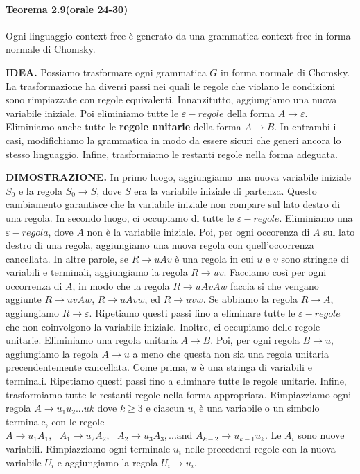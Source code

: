 \documentclass{article}
\begin{document}
\paragraph{Teorema 2.9(orale 24-30)} 
\begin{tcolorbox}[colback=yellow!10!white, colframe=yellow!50!black, title=Teorema 2.9]
    Ogni linguaggio context-free è generato da una grammatica context-free in forma normale di Chomsky.
\end{tcolorbox}

\textbf{IDEA.}
Possiamo trasformare ogni grammatica $G$ in forma normale di Chomsky. La trasformazione ha diversi passi nei quali le regole che violano le condizioni sono rimpiazzate con regole equivalenti. Innanzitutto, aggiungiamo una nuova variabile iniziale. Poi eliminiamo tutte le \textbf{$\varepsilon-regole$} della forma $A \rightarrow \varepsilon$. Eliminiamo anche tutte le \textbf{regole unitarie} della forma $A \rightarrow B$. In entrambi i casi, modifichiamo la grammatica in modo da essere sicuri che generi ancora lo stesso linguaggio. Infine, trasformiamo le restanti regole nella forma adeguata.
\vspace{1em}

\textbf{DIMOSTRAZIONE.}
In primo luogo, aggiungiamo una nuova variabile iniziale $S_0$ e la regola $S_0 \rightarrow S$, dove $S$ era la variabile iniziale di partenza.
Questo cambiamento garantisce che la variabile iniziale non compare sul lato destro di una regola.
In secondo luogo, ci occupiamo di tutte le $\varepsilon-regole$. Eliminiamo una $\varepsilon-regola$, dove $A$ non è la variabile iniziale. Poi, per ogni occorenza di $A$ sul lato destro di una regola, aggiungiamo una nuova regola con quell'occorrenza cancellata. In altre parole, se $R \rightarrow uAv$ è una regola in cui $u$ e $v$ sono stringhe di variabili e terminali, aggiungiamo la regola $R \rightarrow uv$. Facciamo così per ogni occorrenza di $A$, in modo che la regola $R \rightarrow uAvAw$ faccia si che vengano aggiunte $R\rightarrow uvAw$, $R \rightarrow uAvw$, ed $R \rightarrow uvw$. Se abbiamo la regola $R \rightarrow A$, aggiungiamo $R \rightarrow \varepsilon$. Ripetiamo questi passi fino a eliminare tutte le $\varepsilon-regole$ che non coinvolgono la variabile iniziale.
Inoltre, ci occupiamo delle regole unitarie. Eliminiamo una regola unitaria $A \rightarrow B$. Poi, per ogni regola $B \rightarrow u$, aggiungiamo la regola $A \rightarrow u$ a meno che questa non sia una regola unitaria precendentemente cancellata.
Come prima, $u$ è una stringa di variabili e terminali. Ripetiamo questi passi fino a eliminare tutte le regole unitarie.
Infine, trasformiamo tutte le restanti regole nella forma appropriata.
Rimpiazziamo ogni regola $A \rightarrow u_1u_2...uk$ dove $k \geq 3$ e ciascun $u_i$ è una variabile o un simbolo terminale, con le regole $A \rightarrow u_1A_1,\text{ }A_1 \rightarrow u_2A_2,\text{ }A_2 \rightarrow u_3A_3,...\text{and } A_{k-2} \rightarrow u_{k-1}u_k$. Le $A_i$ sono nuove variabili.
Rimpiazziamo ogni terminale $u_i$ nelle precedenti regole con la nuova variabile $U_i$ e aggiungiamo la regola $U_i \rightarrow u_i$.
\end{document}
